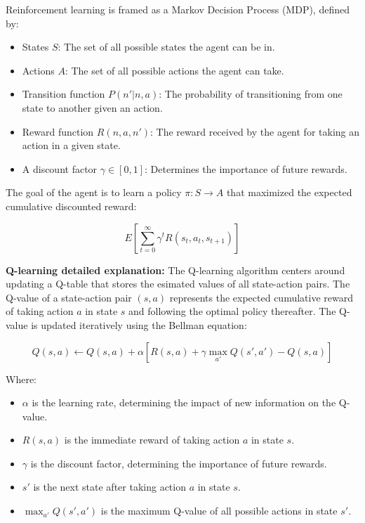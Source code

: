 \documentclass{kththesis}
\begin{document}
Reinforcement learning is framed as a Markov Decision Process (MDP), defined by:

\begin{itemize}
    \item States $S$: The set of all possible states the agent can be in.
    \item Actions $A$: The set of all possible actions the agent can take.
    \item Transition function $P(n'|n,a)$: The probability of transitioning from one state to another given an action.
    \item Reward function $R(n,a,n')$: The reward received by the agent for taking an action in a given state.
    \item A discount factor $\gamma \in [0,1]$: Determines the importance of future rewards. 
\end{itemize}

The goal of the agent is to learn a policy $\pi: S \rightarrow A$ that maximized the expected cumulative discounted reward:

\begin{equation}
    E\left[\sum_{t=0}^{\infty} \gamma^t R(s_t, a_t, s_{t+1})\right]
\end{equation}

\textbf{Q-learning detailed explanation:}
The Q-learning algorithm centers around updating a Q-table that stores the esimated values of all state-action pairs. The Q-value of a state-action pair $(s, a)$ represents the expected cumulative reward of taking action $a$ in state $s$ and following the optimal policy thereafter. The Q-value is updated iteratively using the Bellman equation:

\begin{equation}
    Q(s, a) \leftarrow Q(s, a) + \alpha \left[R(s, a) + \gamma \max_{a'} Q(s', a') - Q(s, a)\right]
\end{equation}

Where:

\begin{itemize}
    \item $\alpha$ is the learning rate, determining the impact of new information on the Q-value.
    \item $R(s, a)$ is the immediate reward of taking action $a$ in state $s$.
    \item $\gamma$ is the discount factor, determining the importance of future rewards.
    \item $s'$ is the next state after taking action $a$ in state $s$.
    \item $\max_{a'} Q(s', a')$ is the maximum Q-value of all possible actions in state $s'$.
\end{itemize}
\end{document}
